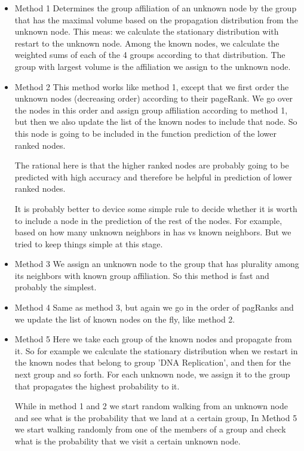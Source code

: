 \begin{itemize}
\item{Method 1} Determines the group affiliation of an unknown node by the group
that has the maximal volume based on the propagation distribution from the
unknown node. This meas: we calculate the stationary distribution with restart
to the unknown node. Among the known nodes, we calculate the weighted sums of
each of the 4 groups according to that distribution. The group with largest
volume is the affiliation we assign to the unknown node.

\item{Method 2} This method works like method 1, except that we first order the
unknown nodes (decreasing order) according to their pageRank. We go over the
nodes in this order and assign group affiliation according to method 1, but then
we also update the list of the known nodes to include that node. So this node is
going to be included in the function prediction of the lower ranked nodes.

The rational here is that the higher ranked nodes are probably going to be
predicted with high accuracy and therefore be helpful in prediction of lower
ranked nodes. 

It is probably better to device some simple rule to decide whether it is worth
to include a node in the prediction of the rest of the nodes. For example, based
on how many unknown neighbors in has vs known neighbors. But we tried to keep
things simple at this stage.

\item{Method 3} We assign an unknown node to the group that has plurality among
its neighbors with known group affiliation. So this method is fast and
probably the simplest.

\item{Method 4} Same as method 3, but again we go in the order of pagRanks and
we update the list of known nodes on the fly, like method 2.

\item{Method 5} Here we take each group of the known nodes and propagate from
it. So for example we calculate the stationary distribution when we restart in
the known nodes that belong to group 'DNA Replication', and then for the next
group and so forth. For each unknown node, we assign it to the group that
propagates the highest probability to it.

While in method 1 and 2 we start random walking from an unknown node and see
what is the probability that we land at a certain group, In Method 5 we start
walking randomly from one of the members of a group and check what is the
probability that we visit a certain unknown node.


\end{itemize}

